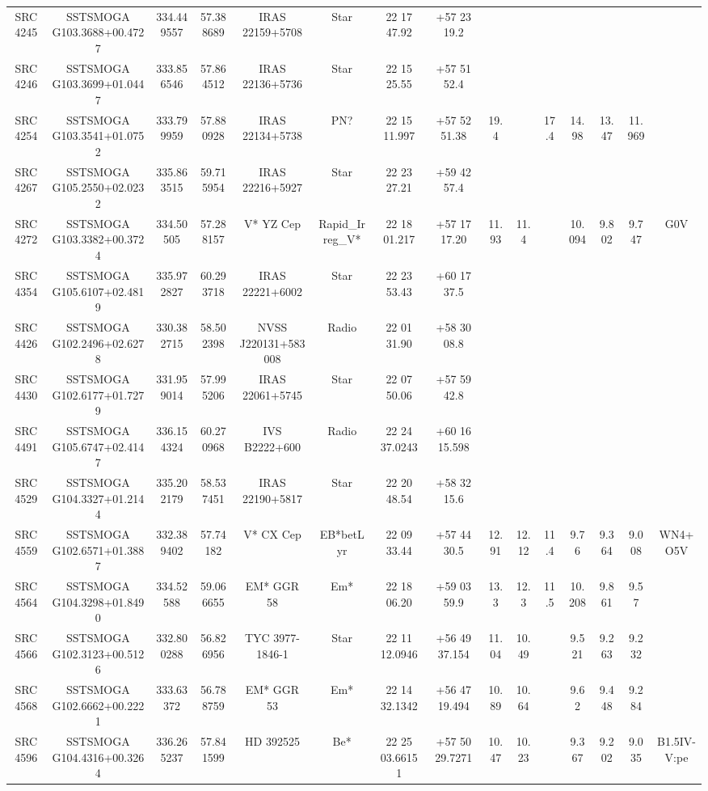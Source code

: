 \begin{table}
\begin{tabular}{ccccccccccccccc}
SRC4245 & SSTSMOGA G103.3688+00.4727 & 334.449557 & 57.388689 & IRAS 22159+5708 & Star & 22 17 47.92 & +57 23 19.2 &  &  &  &  &  &  &  \\
SRC4246 & SSTSMOGA G103.3699+01.0447 & 333.856546 & 57.864512 & IRAS 22136+5736 & Star & 22 15 25.55 & +57 51 52.4 &  &  &  &  &  &  &  \\
SRC4254 & SSTSMOGA G103.3541+01.0752 & 333.799959 & 57.880928 & IRAS 22134+5738 & PN? & 22 15 11.997 & +57 52 51.38 & 19.4 &  & 17.4 & 14.98 & 13.47 & 11.969 &  \\
SRC4267 & SSTSMOGA G105.2550+02.0232 & 335.863515 & 59.715954 & IRAS 22216+5927 & Star & 22 23 27.21 & +59 42 57.4 &  &  &  &  &  &  &  \\
SRC4272 & SSTSMOGA G103.3382+00.3724 & 334.50505 & 57.288157 & V* YZ Cep & Rapid_Irreg_V* & 22 18 01.217 & +57 17 17.20 & 11.93 & 11.4 &  & 10.094 & 9.802 & 9.747 & G0V \\
SRC4354 & SSTSMOGA G105.6107+02.4819 & 335.972827 & 60.293718 & IRAS 22221+6002 & Star & 22 23 53.43 & +60 17 37.5 &  &  &  &  &  &  &  \\
SRC4426 & SSTSMOGA G102.2496+02.6278 & 330.382715 & 58.502398 & NVSS J220131+583008 & Radio & 22 01 31.90 & +58 30 08.8 &  &  &  &  &  &  &  \\
SRC4430 & SSTSMOGA G102.6177+01.7279 & 331.959014 & 57.995206 & IRAS 22061+5745 & Star & 22 07 50.06 & +57 59 42.8 &  &  &  &  &  &  &  \\
SRC4491 & SSTSMOGA G105.6747+02.4147 & 336.154324 & 60.270968 & IVS B2222+600 & Radio & 22 24 37.0243 & +60 16 15.598 &  &  &  &  &  &  &  \\
SRC4529 & SSTSMOGA G104.3327+01.2144 & 335.202179 & 58.537451 & IRAS 22190+5817 & Star & 22 20 48.54 & +58 32 15.6 &  &  &  &  &  &  &  \\
SRC4559 & SSTSMOGA G102.6571+01.3887 & 332.389402 & 57.74182 & V* CX Cep & EB*betLyr & 22 09 33.44 & +57 44 30.5 & 12.91 & 12.12 & 11.4 & 9.76 & 9.364 & 9.008 & WN4+O5V \\
SRC4564 & SSTSMOGA G104.3298+01.8490 & 334.52588 & 59.066655 & EM* GGR   58 & Em* & 22 18 06.20 & +59 03 59.9 & 13.3 & 12.3 & 11.5 & 10.208 & 9.861 & 9.57 &  \\
SRC4566 & SSTSMOGA G102.3123+00.5126 & 332.800288 & 56.826956 & TYC 3977-1846-1 & Star & 22 11 12.0946 & +56 49 37.154 & 11.04 & 10.49 &  & 9.521 & 9.263 & 9.232 &  \\
SRC4568 & SSTSMOGA G102.6662+00.2221 & 333.63372 & 56.788759 & EM* GGR   53 & Em* & 22 14 32.1342 & +56 47 19.494 & 10.89 & 10.64 &  & 9.62 & 9.448 & 9.284 &  \\
SRC4596 & SSTSMOGA G104.4316+00.3264 & 336.265237 & 57.841599 & HD 392525 & Be* & 22 25 03.66151 & +57 50 29.7271 & 10.47 & 10.23 &  & 9.367 & 9.202 & 9.035 & B1.5IV-V:pe \\
\end{tabular}
\end{table}
